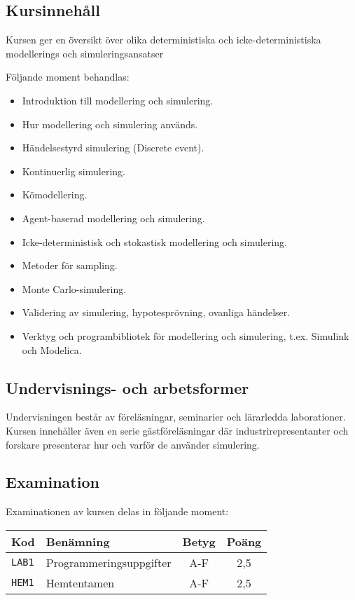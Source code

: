 \subsection*{Kursinnehåll}

Kursen ger en översikt över olika deterministiska och
icke-deterministiska modellerings och simuleringsansatser

Följande moment behandlas:

\begin{itemize}
\tightlist
\item
  Introduktion till modellering och simulering.
\item
  Hur modellering och simulering används.
\item
  Händelsestyrd simulering (Discrete event).
\item
  Kontinuerlig simulering.
\item
  Kömodellering.
\item
  Agent-baserad modellering och simulering.
\item
  Icke-deterministisk och stokastisk modellering och simulering.
\item
  Metoder för sampling.
\item
  Monte Carlo-simulering.
\item
  Validering av simulering, hypotesprövning, ovanliga händelser.
\item
  Verktyg och programbibliotek för modellering och simulering, t.ex.
  Simulink och Modelica.
\end{itemize}

\subsection*{Undervisnings- och
arbetsformer}

Undervisningen består av föreläsningar, seminarier och lärarledda
laborationer. Kursen innehåller även en serie gästföreläsningar där
industrirepresentanter och forskare presenterar hur och varför de
använder simulering.

\subsection*{Examination}

Examinationen av kursen delas in följande moment:

\begin{longtable}[]{@{}llcc@{}}
\toprule
\textsf{Kod} & \textsf{Benämning} & \textsf{Betyg} & \textsf{Poäng}\tabularnewline
\midrule
\endhead
\texttt{LAB1} & Programmeringsuppgifter & A-F & 2,5\tabularnewline
\texttt{HEM1} & Hemtentamen & A-F & 2,5\tabularnewline
\bottomrule
\end{longtable}

